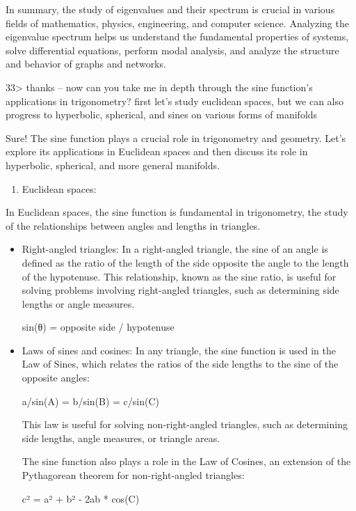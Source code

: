 \documentclass[
]{article}
\providecommand{\tightlist}{%
  \setlength{\itemsep}{0pt}\setlength{\parskip}{0pt}}
\begin{document}
In summary, the study of eigenvalues and their spectrum is crucial in
various fields of mathematics, physics, engineering, and computer
science. Analyzing the eigenvalue spectrum helps us understand the
fundamental properties of systems, solve differential equations, perform
modal analysis, and analyze the structure and behavior of graphs and
networks.

33\textgreater{} thanks -- now can you take me in depth through the sine
function's applications in trigonometry? first let's study euclidean
spaces, but we can also progress to hyperbolic, spherical, and sines on
various forms of manifolds

Sure! The sine function plays a crucial role in trigonometry and
geometry. Let's explore its applications in Euclidean spaces and then
discuss its role in hyperbolic, spherical, and more general manifolds.

\begin{enumerate}
\def\labelenumi{\arabic{enumi}.}
\tightlist
\item
  Euclidean spaces:
\end{enumerate}

In Euclidean spaces, the sine function is fundamental in trigonometry,
the study of the relationships between angles and lengths in triangles.

\begin{itemize}
\item
  Right-angled triangles: In a right-angled triangle, the sine of an
  angle is defined as the ratio of the length of the side opposite the
  angle to the length of the hypotenuse. This relationship, known as the
  sine ratio, is useful for solving problems involving right-angled
  triangles, such as determining side lengths or angle measures.

  sin(θ) = opposite side / hypotenuse
\item
  Laws of sines and cosines: In any triangle, the sine function is used
  in the Law of Sines, which relates the ratios of the side lengths to
  the sine of the opposite angles:

  a/sin(A) = b/sin(B) = c/sin(C)

  This law is useful for solving non-right-angled triangles, such as
  determining side lengths, angle measures, or triangle areas.

  The sine function also plays a role in the Law of Cosines, an
  extension of the Pythagorean theorem for non-right-angled triangles:

  c² = a² + b² - 2ab * cos(C)
\end{itemize}
\end{document}

